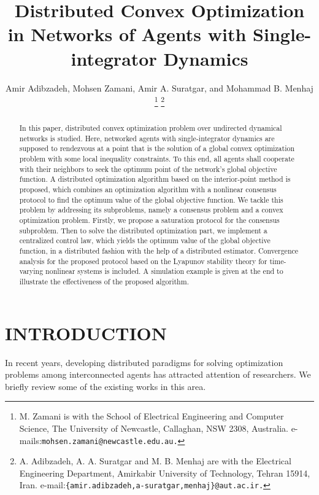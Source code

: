\documentclass[letterpaper, 10 pt, conference]{ieeeconf}  %
\title{\LARGE \bf
Distributed Convex Optimization in Networks of Agents with Single-integrator Dynamics}
\author{ Amir Adibzadeh, Mohsen Zamani,  Amir A. Suratgar, and Mohammad B. Menhaj
\thanks{M. Zamani is with the School of Electrical Engineering and Computer Science, The University of Newcastle, Callaghan, NSW 2308, Australia. e-mails:{\tt\small  mohsen.zamani@newcastle.edu.au.}}
\thanks{A. Adibzadeh, A. A. Suratgar and M. B. Menhaj  are with the Electrical Engineering
	Department, Amirkabir University of Technology, Tehran 15914, Iran. e-mail:{\tt\small \{amir.adibzadeh,a-suratgar,menhaj\}@aut.ac.ir.}}}
\newcommand{\crb}{\color{black}}
\newcommand{\crg}{\color{black}}
\begin{document}
\maketitle
\thispagestyle{empty}
\pagestyle{empty}


{\crg
	\begin{abstract}
		In this paper, distributed convex optimization problem
		over undirected dynamical networks is studied. Here, networked agents
		with single-integrator dynamics are supposed to rendezvous at a point
		that is the solution of a global convex optimization problem with some local
		inequality constraints. To this end, all agents shall cooperate with
		their neighbors to seek the optimum point of the network's global  objective function. A distributed optimization algorithm based on the interior-point
		method is proposed, which combines an optimization algorithm with
		a nonlinear consensus protocol to find the optimum value of the global objective function. {\crb We tackle
			this problem by addressing its subproblems, namely a consensus problem
			and a convex optimization problem. Firstly, we propose a saturation protocol for the consensus subproblem. Then to solve the distributed optimization part, we implement a centralized control law, which yields the optimum value of the global objective function,  in a distributed fashion with the help of a distributed estimator.  Convergence analysis for the proposed protocol } based
		on the Lyapunov stability theory for time-varying nonlinear systems is
		included. A simulation example is given at the end to illustrate the
		effectiveness of the proposed algorithm.
	\end{abstract}
}
\section{INTRODUCTION}

{\crb
	In recent years,  developing distributed  paradigms  for solving  optimization problems among interconnected agents has attracted attention of researchers. 
	We briefly review some of the existing  works in this area.}
\end{document}
